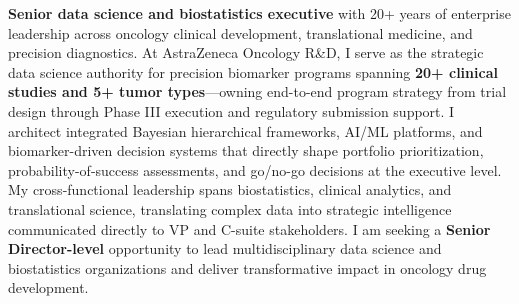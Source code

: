 
\textbf{Senior data science and biostatistics executive} with 20+ years of enterprise leadership across oncology clinical development, translational medicine, and precision diagnostics. At AstraZeneca Oncology R\&D, I serve as the strategic data science authority for precision biomarker programs spanning \textbf{20+ clinical studies and 5+ tumor types}---owning end-to-end program strategy from trial design through Phase III execution and regulatory submission support. I architect integrated Bayesian hierarchical frameworks, AI/ML platforms, and biomarker-driven decision systems that directly shape portfolio prioritization, probability-of-success assessments, and go/no-go decisions at the executive level. My cross-functional leadership spans biostatistics, clinical analytics, and translational science, translating complex data into strategic intelligence communicated directly to VP and C-suite stakeholders. I am seeking a \textbf{Senior Director-level} opportunity to lead multidisciplinary data science and biostatistics organizations and deliver transformative impact in oncology drug development.


